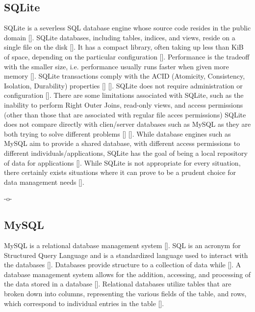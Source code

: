 \subsection{SQLite}

SQLite is a severless SQL database engine whose source code resides in
the public domain [\cite{sqliteabout}]. SQLite databases, including
tables, indices, and views, reside on a single file on the
disk [\cite{sqliteabout}]. It has a compact library, often taking up
less than KiB of space, depending on the particular
configuration [\cite{sqliteabout}]. Performance is the tradeoff with the
smaller size, i.e. performance usually runs faster when given more
memory [\cite{sqliteabout}]. SQLite transactions comply with the ACID
(Atomicity, Consistency, Isolation, Durability)
properties [\cite{sqliteabout}] [\cite{acid}]. SQLite does not require
administration or configuration [\cite{sqliteover}]. There are some
limitations associated with SQLite, such as the inability to perform
Right Outer Joins, read-only views, and access permissions (other than
those that are associated with regular file acces permissions) SQLite
does not compare directly with clien/server databases such as MySQL as
they are both trying to solve different
problems [\cite{sqlitewhentouse}] [\cite{sqliteover}].  While database
engines such as MySQL aim to provide a shared database, with different
access permissions to different individuals/applications, SQLite has
the goal of being a local repository of data for
applications [\cite{sqlitewhentouse}]. While SQLite is not appropriate
for every situation, there certainly exists situations where it can
prove to be a prudent choice for data management
needs [\cite{sqlitewhentouse}].

     -o-
     
\subsection{MySQL}

MySQL is a relational database management system [\cite{devmysql}]. SQL
is an acronym for Structured Query Language and is a standardized
language used to interact with the databases [\cite{devmysql}].
Databases provide structure to a collection of data
while [\cite{devmysql}]. A database management system allows for the
addition, accessing, and processing of the data stored in a
database [\cite{devmysql}]. Relational databases utilize tables that are
broken down into columns, representing the various fields of the
table, and rows, which correspond to individual entries in the
table [\cite{howmysql}].

